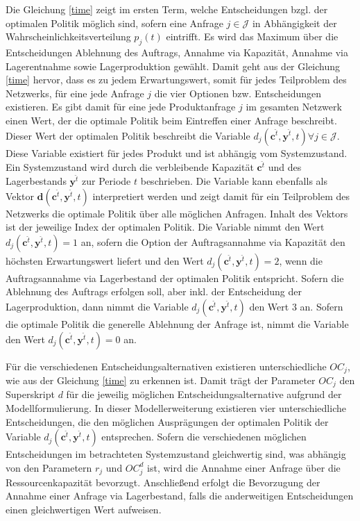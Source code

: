 Die Gleichung \eqref{time} zeigt im ersten Term, welche Entscheidungen bzgl. der optimalen Politik möglich sind, sofern eine Anfrage $j\in\mathcal J$ in Abhängigkeit der Wahrscheinlichkeitsverteilung $p_j(t)$ eintrifft. Es wird das Maximum über die Entscheidungen \glqq Ablehnung des Auftrags{\grqq}, \glqq Annahme via Kapazität{\grqq}, \glqq Annahme via Lagerentnahme{\grqq} sowie \glqq Lagerproduktion{\grqq} gewählt. Damit geht aus der Gleichung \eqref{time} hervor, dass es zu jedem Erwartungswert, somit für jedes Teilproblem des Netzwerks, für eine jede Anfrage $j$ die vier Optionen bzw. Entscheidungen existieren. Es gibt damit für eine jede Produktanfrage $j$ im gesamten Netzwerk einen Wert, der die optimale Politik beim Eintreffen einer Anfrage beschreibt. Dieser Wert der optimalen Politik beschreibt die Variable $d_j({\textbf{c}^{\hat t},\textbf{y}^{\hat t},t})\forall j\in\mathcal{J}$. Diese Variable existiert für jedes Produkt und ist abhängig vom Systemzustand. Ein Systemzustand wird durch die verbleibende Kapazität $\textbf{c}^{\hat t}$ und des Lagerbestands $\textbf{y}^{\hat t}$ zur Periode $t$ beschrieben. Die Variable kann ebenfalls als Vektor $\textbf{d}({\textbf{c}^{\hat t},\textbf{y}^{\hat t},t})$ interpretiert werden und zeigt damit für ein Teilproblem des Netzwerks die optimale Politik über alle möglichen Anfragen. Inhalt des Vektors ist der jeweilige Index der optimalen Politik. Die Variable nimmt den Wert $d_j({\textbf{c}^{\hat t},\textbf{y}^{\hat t},t})=1$ an, sofern die Option der Auftragsannahme via Kapazität den höchsten Erwartungswert liefert und den Wert $d_j({\textbf{c}^{\hat t},\textbf{y}^{\hat t},t})=2$, wenn die Auftragsannahme via Lagerbestand der optimalen Politik entspricht. Sofern die Ablehnung des Auftrags erfolgen soll, aber inkl. der Entscheidung der Lagerproduktion, dann nimmt die Variable $d_j({\textbf{c}^{\hat t},\textbf{y}^{\hat t},t})$ den Wert $3$ an. Sofern die optimale Politik die generelle Ablehnung der Anfrage ist, nimmt die Variable den Wert $d_j({\textbf{c}^{\hat t},\textbf{y}^{\hat t},t})=0$ an.

Für die verschiedenen Entscheidungsalternativen existieren unterschiedliche $OC_{j}$, wie aus der Gleichung \eqref{time} zu erkennen ist. Damit trägt der Parameter $OC_{j}$ den Superskript $d$ für die jeweilig möglichen Entscheidungsalternative aufgrund der Modellformulierung. In dieser Modellerweiterung existieren vier unterschiedliche Entscheidungen, die den möglichen Ausprägungen der optimalen Politik der Variable $d_{j}(\textbf{c}^{\hat t},\textbf{y}^{\hat t},t)$ entsprechen. Sofern die verschiedenen möglichen Entscheidungen im betrachteten Systemzustand gleichwertig sind, was abhängig von den Parametern $r_{j}$ und $OC_j^{d}$ ist, wird die Annahme einer Anfrage über die Ressourcenkapazität bevorzugt. Anschließend erfolgt die Bevorzugung der Annahme einer Anfrage via Lagerbestand, falls die anderweitigen Entscheidungen einen gleichwertigen Wert aufweisen.

